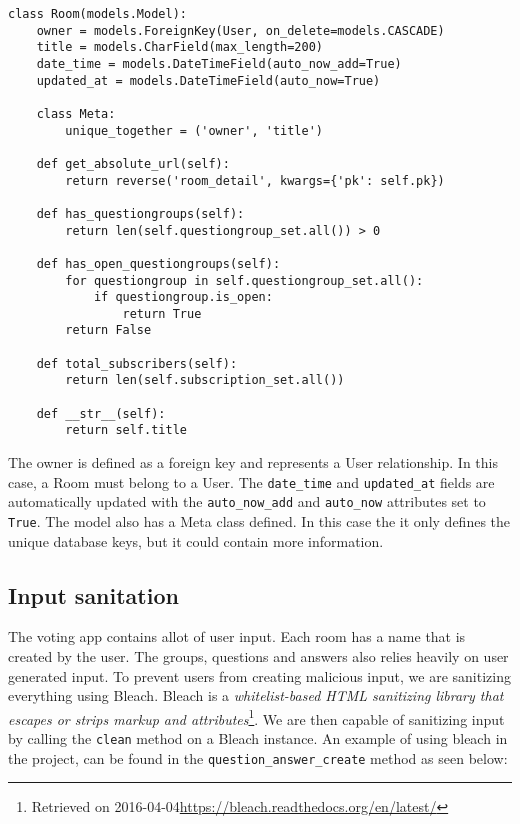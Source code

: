 \begin{lstlisting}[caption=The Room Model, label=lst:room-model]
class Room(models.Model):
    owner = models.ForeignKey(User, on_delete=models.CASCADE)
    title = models.CharField(max_length=200)
    date_time = models.DateTimeField(auto_now_add=True)
    updated_at = models.DateTimeField(auto_now=True)

    class Meta:
        unique_together = ('owner', 'title')

    def get_absolute_url(self):
        return reverse('room_detail', kwargs={'pk': self.pk})

    def has_questiongroups(self):
        return len(self.questiongroup_set.all()) > 0

    def has_open_questiongroups(self):
        for questiongroup in self.questiongroup_set.all():
            if questiongroup.is_open:
                return True
        return False

    def total_subscribers(self):
        return len(self.subscription_set.all())

    def __str__(self):
        return self.title
\end{lstlisting}

The owner is defined as a foreign key and represents a User relationship. In this case, a Room must belong to a User. The \texttt{date\_time} and \texttt{updated\_at} fields are automatically updated with the \texttt{auto\_now\_add} and \texttt{auto\_now} attributes set to \texttt{True}. The model also has a Meta class defined. In this case the it only defines the unique database keys, but it could contain more information.

\subsection*{Input sanitation}
The voting app contains allot of user input. Each room has a name that is created by the user. The groups, questions and answers also relies heavily on user generated input. To prevent users from creating malicious input, we are sanitizing everything using Bleach. Bleach is a \emph{whitelist-based HTML sanitizing library that escapes or strips markup and attributes}\footnote{Retrieved on 2016-04-04\url{https://bleach.readthedocs.org/en/latest/}}. We are then capable of sanitizing input by calling the \texttt{clean} method on a Bleach instance. An example of using bleach in the project, can be found in the \texttt{question\_answer\_create} method as seen below:

